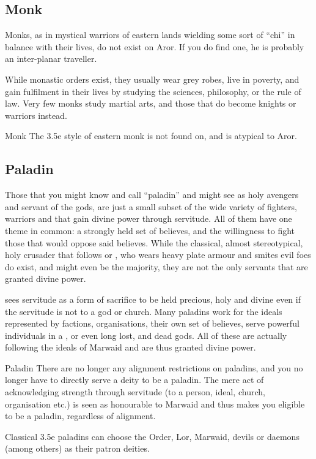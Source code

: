 \subsection{Monk}
\label{sec:Monk}

Monks, as in mystical warriors of eastern lands wielding some sort of ``chi''
in balance with their lives, do not exist on Aror. If you do find one, he is
probably an inter-planar traveller.

While monastic orders exist, they usually wear grey robes, live in poverty,
and gain fulfilment in their lives by studying the sciences, philosophy, or
the rule of law. Very few monks study martial arts, and those that do become
knights or warriors instead.

\begin{35e}{Monk}
  The 3.5e style of eastern monk is not found on, and is atypical to Aror.
\end{35e}

\subsection{Paladin}
\label{sec:Paladin}

Those that you might know and call ``paladin'' and might see as holy avengers
and servant of the gods, are just a small subset of the wide variety of
fighters, warriors and that gain divine power through servitude. All of them
have one theme in common: a strongly held set of believes, and the willingness
to fight those that would oppose said believes. While the classical, almost
stereotypical, holy crusader that follows  or
, who wears heavy plate armour and smites evil foes do
exist, and might even be the majority, they are not the only servants that are
granted divine power.

 sees servitude as a form of sacrifice to be held
precious, holy and divine even if the servitude is not to a god or church. Many
paladins work for the ideals represented by factions, organisations, their own
set of believes, serve powerful individuals in a , or
even long lost, and dead gods. All of these are actually following the ideals
of Marwaid and are thus granted divine power.

\begin{35e}{Paladin}
  There are no longer any alignment restrictions on paladins, and you no longer
  have to directly serve a deity to be a paladin. The mere act of acknowledging
  strength through servitude (to a person, ideal, church, organisation etc.) is
  seen as honourable to Marwaid and thus makes you eligible to be a paladin,
  regardless of alignment.

  Classical 3.5e paladins can choose the Order, Lor, Marwaid, devils or
  daemons (among others) as their patron deities.
\end{35e}

